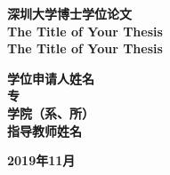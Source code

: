 \begin{titlepage}
\small
{}\uline{\makebox[7em][r]{}}\hfill {}
\uline{\makebox[7em][r]{}}

\uline{\makebox[7em][r]{}}\hfill {}
\uline{\makebox[7em][r]{}}
\normalsize

\vspace{10mm}
%

\vspace{10mm}

\begin{center}
 \textbf{深圳大学博士学位论文}\\[10mm]
 \textbf{The Title of Your Thesis}\\
 \textbf{The Title of Your Thesis}\\[50mm]
\end{center}
\begin{center}
\large \textbf{学位申请人姓名}\uline{}\\
\large \textbf{专}\uline{}\\
\large \textbf{学院（系、所）}\uline{}\\
\large \textbf{指导教师姓名\quad}\uline{}\\[50mm]
\end{center}
\begin{center}
\textbf{2019年11月}
\end{center}

\end{titlepage}

\vspace*{10mm}
\thispagestyle{empty}
